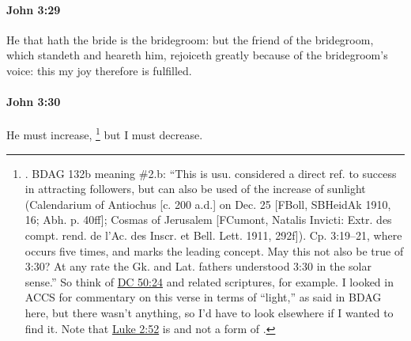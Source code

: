 		\paragraph{John 3:29} %
			\label{JOHN-3-29}

			He that hath the bride is the bridegroom: but the friend of the bridegroom, which standeth and heareth him, rejoiceth greatly because of the bridegroom's voice: this my joy therefore is fulfilled.

			\begin{framed}
			\scriptsize
				\begin{compactdesc}
					\item[SBLG] 
				\end{compactdesc}
			\end{framed}

		\paragraph{John 3:30} %
			\label{JOHN-3-30}

			He must increase,%
				\footnote{%
					. BDAG 132b meaning \#2.b: ``This is usu. considered a direct ref. to success in attracting followers, but  can also be used of the increase of sunlight (Calendarium of Antiochus [c. 200 a.d.] on Dec. 25  [FBoll, SBHeidAk 1910, 16; Abh. p. 40ff]; Cosmas of Jerusalem [FCumont, Natalis Invicti: Extr. des compt. rend. de l'Ac. des Inscr. et Bell. Lett. 1911, 292f]). Cp. 3:19--21, where  occurs five times, and marks the leading concept. May this not also be true of 3:30? At any rate the Gk. and Lat. fathers understood 3:30 in the solar sense.'' So think of \hyperref[DC50-24]{DC 50:24} and related scriptures, for example. I looked in ACCS for commentary on this verse in terms of ``light,'' as said in BDAG here, but there wasn't anything, so I'd have to look elsewhere if I wanted to find it. Note that \hyperref[LUKE-2-52]{Luke 2:52} is  and not a form of .
					}
			but I must decrease.


